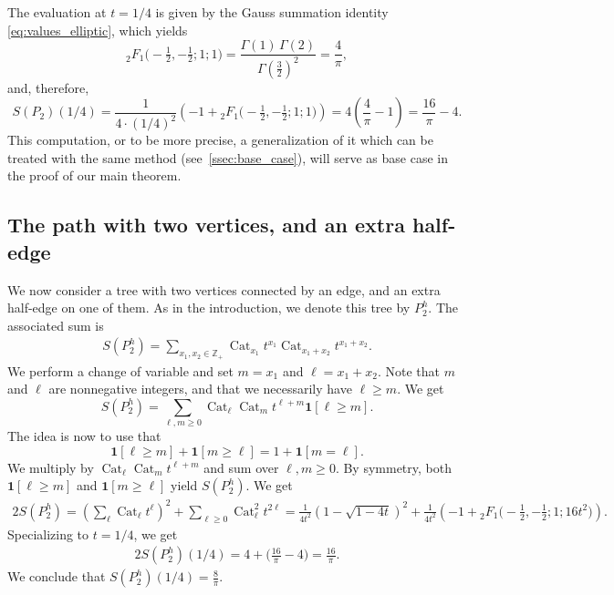 \documentclass[12pt]{amsart}
\theoremstyle{plain}
\theoremstyle{remark}
\def\Z{\mathbb{Z}}
\def\One{\bm{1}}
\DeclareMathOperator{\Cat}{Cat}
\begin{document}
The evaluation at $t=1/4$ is given by the Gauss summation identity \eqref{eq:values_elliptic}, which yields
\[{}_{2}^{}{{}{{}{F_{1}^{}}}}\big(-\tfrac12,-\tfrac12; 1; 1\big)= \frac{\Gamma(1)\, \Gamma(2)}{\Gamma(\tfrac32)^2} = \frac4{\pi},\]
and, therefore,
\[S(P_2)(1/4) = \frac{1}{4 \cdot (1/4)^2} \left(  -1 + {}_{2}^{}{{}{{}{F_{1}^{}}}}\big(-\tfrac12,-\tfrac12; 1; 1\big) \right) = 4 \left(\frac{4}{\pi}-1\right) = \frac{16}{\pi} - 4.\]
This computation, or to be more precise, a generalization of it which can be treated
with the same method (see~\cref{ssec:base_case}),
will serve as base case in the proof of our main theorem.

\subsection{The path with two vertices, and an extra half-edge}
\label{ssec:ex_P2h}
We now consider a tree with two vertices connected by an edge, and an extra half-edge on one of them.
As in the introduction, we denote this tree by $P^h_2$. The associated sum is 
\begin{align*}
S(P^h_2) = \sum_{x_1,x_2 \in \Z_+} \Cat_{x_1} t^{x_1} \Cat_{x_1+x_2} t^{x_1+x_2}.
\end{align*}
We perform a change of variable and set $m=x_1$ and $\ell=x_1+x_2$.
Note that $m$ and $\ell$ are nonnegative integers,
and that we necessarily have $\ell \ge m$.
We get 
\[S(P^h_2)= \sum_{\ell, m \ge 0} \Cat_{\ell} \Cat_m t^{\ell+m} \One[\ell \ge m].\]
The idea is now to use that 
\begin{equation}\label{eq:reversing_inequality_example}
  \One[\ell \ge m] + \One[m \ge \ell] = 1 + \One[m=\ell].
\end{equation}
We multiply by $\Cat_{\ell} \Cat_m t^{\ell+m}$ and sum over $\ell, m \ge 0$.
By symmetry, both $\One[\ell \ge m]$ and $\One[m \ge \ell]$ yield $S(P^h_2)$. We get
\begin{align*}
2 S(P^h_2) = \left(\sum_{\ell} \Cat_{\ell} t^{\ell}\right)^2 + \sum_{\ell \ge 0} \Cat_\ell^2 t^{2\ell}
= \frac{1}{4 t^2}\left( 1-\sqrt{1-4t} \right)^2 + \frac{1}{4t^2} \left( -1+  {}_{2}^{}{{}{{}{F_{1}^{}}}}\big(-\tfrac12,-\tfrac12; 1; 16t^2\big)\right).
\end{align*}
Specializing to $t=1/4$, we get
\begin{align*}
2 S(P^h_2)(1/4) = 4 + \big( \tfrac{16}{\pi} - 4 \big)= \tfrac{16}{\pi}.
\end{align*}
We conclude that $S(P^h_2)(1/4)=\frac{8}{\pi}$.
\end{document}
